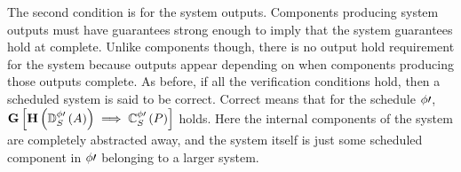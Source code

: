 The second condition is for the system outputs.
Components producing system outputs must have guarantees strong enough to imply that the system guarantees hold at complete.
Unlike components though, there is no output hold requirement for the system because outputs appear depending on when components producing those outputs complete.
As before, if all the verification conditions hold, then a scheduled system is said to be correct.
Correct means that for the schedule $\phi\prime$, $\mathbf{G}\left[\mathbf{H}\left(\mathbb{D}^{\phi\prime}_S\left(A\right)\right) 
\implies \mathbb{C}^{\phi\prime}_{S}\left(P\right)\right]$ holds.
Here the internal components of the system are completely abstracted away, and the system itself is just some scheduled component in $\phi\prime$ belonging to a larger system.
